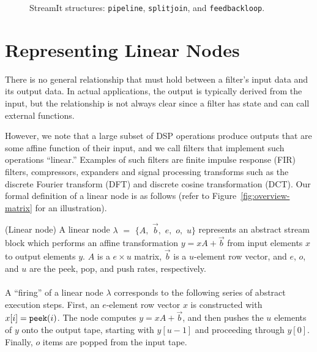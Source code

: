 \begin{figure}[t]
\vspace{-6pt}
\center
\epsfxsize=3.0in
\vspace{-12pt}
\caption{StreamIt structures: {\tt pipeline}, {\tt splitjoin}, and {\tt feedbackloop}.
\protect\label{fig:structures}}
\vspace{-12pt}
\end{figure}

\section{Representing Linear Nodes}
\label{sec:linearrep}

There is no general relationship that must hold between a
filter's input data and its output data. In actual applications, the
output is typically derived from the input, but the relationship is
not always clear since a filter has state and can call external
functions.

However, we note that a large subset of DSP operations produce outputs
that are some affine function of their input, and we call
filters that implement such operations ``linear.''  Examples of such
filters are finite impulse response (FIR) filters, compressors,
expanders and signal processing transforms such as the discrete
Fourier transform (DFT) and discrete cosine transformation (DCT).  Our
formal definition of a linear node is as follows (refer to
Figure~\ref{fig:overview-matrix} for an illustration). \vspace{-4pt}
\begin{definition}(Linear node)
A linear node $\lambda$ $=$ $\{A,$ ${\vec b},$ $e,$ $o,$ $u\}$
represents an abstract stream block which performs an affine
transformation $y = x A + {\vec b}$ from input elements $x$ to output
elements $y$.  $A$ is a $e \times u$ matrix, ${\vec b}$ is a
$u$-element row vector, and $e$, $o$, and $u$ are the peek, pop, and
push rates, respectively. \\ ~ \vspace{-8pt} \\
%
A ``firing'' of a linear node $\lambda$ corresponds to the following
series of abstract execution steps.  First, an $e$-element row vector
$x$ is constructed with $x[i] = \mbox{\tt peek}(i)$.  The node
computes $y = x A + {\vec b}$, and then pushes the $u$ elements of $y$ onto
the output tape, starting with $y[u-1]$ and proceeding through $y[0]$.
Finally, $o$ items are popped from the input tape.
\end{definition} \vspace{-2pt}

